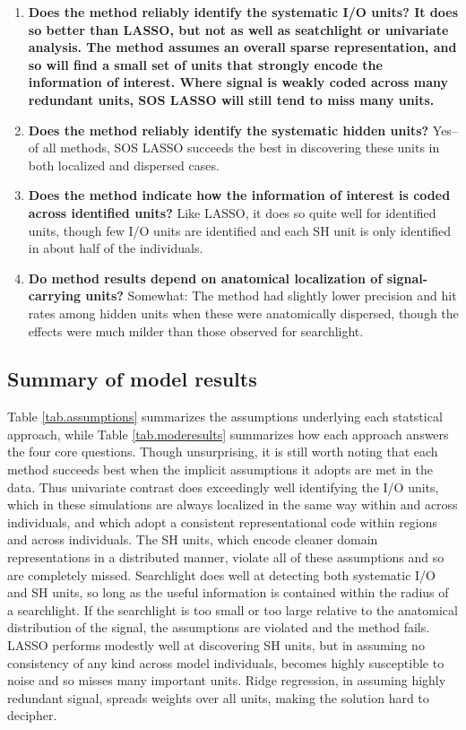 \begin{enumerate}
\item \bf{Does the method reliably identify the systematic I/O units?} It does so better than LASSO, but not as well as seatchlight or univariate analysis. The method assumes an overall sparse representation, and so will find a small set of units that strongly encode the information of interest. Where signal is weakly coded across many redundant units, SOS LASSO will still tend to miss many units.
\item {\bf Does the method reliably identify the systematic hidden units?} Yes--of all methods, SOS LASSO succeeds the best in discovering these units in both localized and dispersed cases.
\item {\bf Does the method indicate how the information of interest is coded across identified units?} Like LASSO, it does so quite well for identified units, though few I/O units are identified and each SH unit is only identified in about half of the individuals.
\item {\bf Do method results depend on anatomical localization of signal-carrying units?} Somewhat: The method had slightly lower precision and hit rates among hidden units when these were anatomically dispersed, though the effects were much milder than those observed for searchlight.
\end{enumerate}

\subsection{Summary of model results}
Table \ref{tab.assumptions} summarizes the assumptions underlying each statstical approach, while Table \ref{tab.moderesults} summarizes how each approach answers the four core questions. Though unsurprising, it is still worth noting that each method succeeds best when the implicit assumptions it adopts are met in the data. Thus univariate contrast does exceedingly well identifying the I/O units, which in these simulations are always localized in the same way within and across individuals, and which adopt a consistent representational code within regions and across individuals. The SH units, which encode cleaner domain representations in a distributed manner, violate all of these assumptions and so are completely missed. Searchlight does well at detecting both systematic I/O and SH units, so long as the useful information is contained within the radius of a searchlight. If the searchlight is too small or too large relative to the anatomical distribution of the signal, the assumptions are violated and the method fails. LASSO performs modestly well at discovering SH units, but in assuming no consistency of any kind across model individuals, becomes highly susceptible to noise and so misses many important units. Ridge regression, in assuming highly redundant signal, spreads weights over all units, making the solution hard to decipher.

